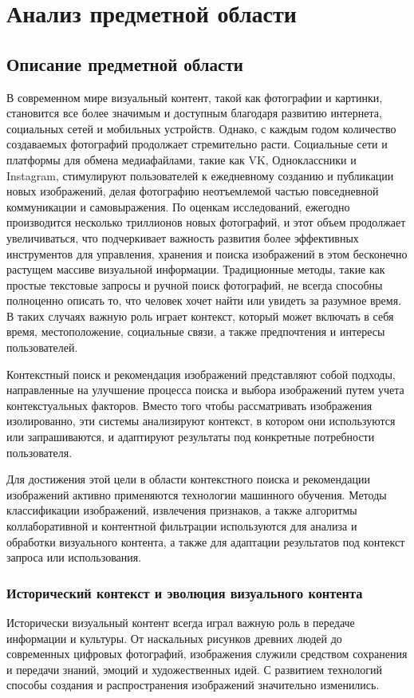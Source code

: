 \newsection
\section{Анализ предметной области}
\subsection{Описание предметной области}
В современном мире визуальный контент, такой как фотографии и картинки, становится все более значимым и доступным благодаря развитию интернета, социальных сетей и мобильных устройств. 
Однако, с каждым годом количество создаваемых фотографий продолжает стремительно расти. Социальные сети и платформы для обмена медиафайлами, такие как VK, Одноклассники и Instagram, стимулируют пользователей к ежедневному созданию и публикации новых изображений, делая фотографию неотъемлемой частью повседневной коммуникации и самовыражения. 
По оценкам исследований, ежегодно производится несколько триллионов новых фотографий, и этот объем продолжает увеличиваться, что подчеркивает важность развития более эффективных инструментов для управления, хранения и поиска изображений в этом бесконечно растущем массиве визуальной информации. Традиционные методы, такие как простые текстовые запросы и ручной поиск фотографий, не всегда способны полноценно описать то, что человек хочет найти или увидеть за разумное время. В таких случаях важную роль играет контекст, который может включать в себя время, местоположение, социальные связи, а также предпочтения и интересы пользователей.

Контекстный поиск и рекомендация изображений представляют собой подходы, направленные на улучшение процесса поиска и выбора изображений путем учета контекстуальных факторов. Вместо того чтобы рассматривать изображения изолированно, эти системы анализируют контекст, в котором они используются или запрашиваются, и адаптируют результаты под конкретные потребности пользователя.

Для достижения этой цели в области контекстного поиска и рекомендации изображений активно применяются технологии машинного обучения. Методы классификации изображений, извлечения признаков, а также алгоритмы коллаборативной и контентной фильтрации используются для анализа и обработки визуального контента, а также для адаптации результатов под контекст запроса или использования.

\subsubsection{Исторический контекст и эволюция визуального контента}
Исторически визуальный контент всегда играл важную роль в передаче информации и культуры. От наскальных рисунков древних людей до современных цифровых фотографий, изображения служили средством сохранения и передачи знаний, эмоций и художественных идей. С развитием технологий способы создания и распространения изображений значительно изменились.

